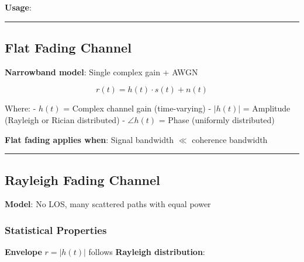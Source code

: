 \textbf{Usage}:

\begin{Shaded}
\begin{Highlighting}[]
\OperatorTok{=}\NormalTok{ np.array([}\OperatorTok{+}\NormalTok{, }\OperatorTok{{-}}\OperatorTok{+}\NormalTok{, }\OperatorTok{+}\NormalTok{, }\OperatorTok{{-}}\OperatorTok{{-}}\NormalTok{])  }
\OperatorTok{=}\OperatorTok{=}\NormalTok{)}
\end{Highlighting}
\end{Shaded}

\begin{center}\rule{0.5\linewidth}{0.5pt}\end{center}

\subsection{Flat Fading Channel}\label{flat-fading-channel}

\textbf{Narrowband model}: Single complex gain + AWGN

\[
r(t) = h(t) \cdot s(t) + n(t)
\]

Where: - \(h(t)\) = Complex channel gain (time-varying) - \(|h(t)|\) =
Amplitude (Rayleigh or Rician distributed) - \(\angle h(t)\) = Phase
(uniformly distributed)

\textbf{Flat fading applies when}: Signal bandwidth \(\ll\) coherence
bandwidth

\begin{center}\rule{0.5\linewidth}{0.5pt}\end{center}

\subsection{Rayleigh Fading Channel}\label{rayleigh-fading-channel}

\textbf{Model}: No LOS, many scattered paths with equal power

\subsubsection{Statistical Properties}\label{statistical-properties}

\textbf{Envelope} \(r = |h(t)|\) follows \textbf{Rayleigh distribution}:

